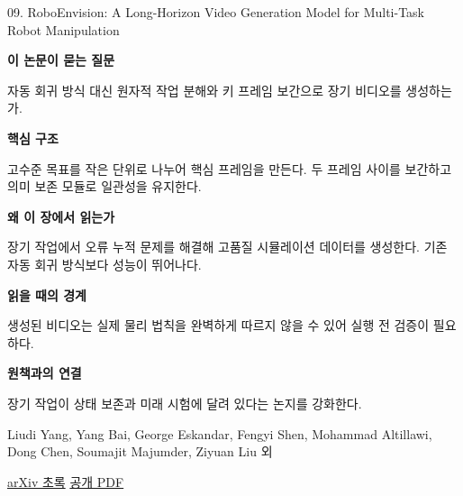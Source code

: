 \documentclass[11pt,openany]{book}
\begin{document}
\begin{termcard}{09. RoboEnvision: A Long-Horizon Video Generation Model for Multi-Task Robot Manipulation}

\par

\medskip

{\sffamily\bfseries\color{deepblue} 이 논문이 묻는 질문}\par

자동 회귀 방식 대신 원자적 작업 분해와 키 프레임 보간으로 장기 비디오를 생성하는가.

\smallskip

{\sffamily\bfseries\color{deepblue} 핵심 구조}\par

고수준 목표를 작은 단위로 나누어 핵심 프레임을 만든다. 두 프레임 사이를 보간하고 의미 보존 모듈로 일관성을 유지한다.

\smallskip

{\sffamily\bfseries\color{deepblue} 왜 이 장에서 읽는가}\par

장기 작업에서 오류 누적 문제를 해결해 고품질 시뮬레이션 데이터를 생성한다. 기존 자동 회귀 방식보다 성능이 뛰어나다.

\smallskip

{\sffamily\bfseries\color{coral} 읽을 때의 경계}\par

생성된 비디오는 실제 물리 법칙을 완벽하게 따르지 않을 수 있어 실행 전 검증이 필요하다.

\smallskip

{\sffamily\bfseries\color{teal} 원책과의 연결}\par

장기 작업이 상태 보존과 미래 시험에 달려 있다는 논지를 강화한다.

\medskip

{\footnotesize\color{muted} Liudi Yang, Yang Bai, George Eskandar, Fengyi Shen, Mohammad Altillawi, Dong Chen, Soumajit Majumder, Ziyuan Liu 외\par

\href{https://arxiv.org/abs/2506.22007}{arXiv 초록} \quad \href{https://arxiv.org/pdf/2506.22007}{공개 PDF}\par}

\end{termcard}
\end{document}
